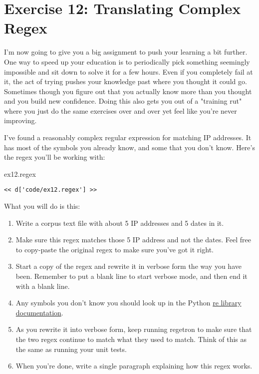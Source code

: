 \chapter{Exercise 12: Translating Complex Regex}

I'm now going to give you a big assignment to push your learning a bit further.
One way to speed up your education is to periodically pick something seemingly
impossible and sit down to solve it for a few hours.  Even if you completely
fail at it, the act of trying pushes your knowledge past where you thought it
could go.  Sometimes though you figure out that you actually know more than you
thought and you build new confidence.  Doing this also gets you out of a
"training rut" where you just do the same exercises over and over yet feel like
you're never improving.

I've found a reasonably complex regular expression for matching IP addresses.
It has most of the symbols you already know, and some that you don't know.
Here's the regex you'll be working with:

\begin{code}{ex12.regex}
\begin{Verbatim}
<< d['code/ex12.regex'] >>
\end{Verbatim}
\end{code}

What you will do is this:

\begin{enumerate}
\item Write a corpus text file with about 5 IP addresses and 5 dates in it.
\item Make sure this regex matches those 5 IP address and not the dates.  Feel
    free to copy-paste the original regex to make sure you've got it right.
\item Start a copy of the regex and rewrite it in verbose form the way you
    have been.  Remember to put a blank line to start verbose mode, and then
    end it with a blank line.
\item Any symbols you don't know you should look up in the Python
    \href{http://docs.python.org/library/re.html}{re library documentation}.
\item As you rewrite it into verbose form, keep running regetron to make sure
    that the two regex continue to match what they used to match.  Think of
    this as the same as running your unit tests.
\item When you're done, write a single paragraph explaining how this regex
    works.
\end{enumerate}

